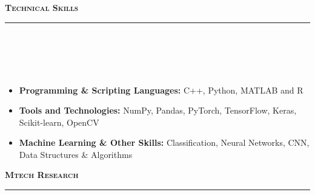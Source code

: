 \documentclass[a4paper,10pt]{article}
\newcommand{\isep}{-2 pt}
\newcommand{\lsep}{-0.5cm}
\newcommand{\resheading}[1]{{\small
        {
            \begin{minipage}
                {0.992\textwidth}\textbf{{\textsc{#1 \vphantom{p\^{E}} }}}
                \\[-0.3cm]
                \hrule
            \end{minipage}
            \\[-0.5cm]
        }
 }}
\begin{document}
\hspace{0.2cm}\\
\hspace{0.2cm}\\
\hspace{0.2cm}\\
\hspace{0.2cm}\\
\hspace{0.2cm}\\
\hspace{0.2cm}\\
\hspace{0.2cm}\\
\hspace{0.2cm}\\
\hspace{0.2cm}\\
\hspace{0.2cm}\\
\hspace{0.2cm}\\
\hspace{0.5cm}\\
\resheading{\textbf{\large Technical Skills}}\\[\lsep]
\\ [-0.2cm]
    \begin{itemize}\itemsep \isep
        \item \textbf{Programming \& Scripting Languages:}  C++, Python, MATLAB and R
        \item \textbf{Tools and Technologies:} NumPy, Pandas, PyTorch, TensorFlow, Keras, Scikit-learn, OpenCV
        \item \textbf{Machine Learning \& Other Skills:} Classification, Neural Networks, CNN, Data Structures \& Algorithms
    \end{itemize}
\resheading{\textbf{\large Mtech Research}}\\[\lsep] 
\\ [-0.2cm]
\end{document}
